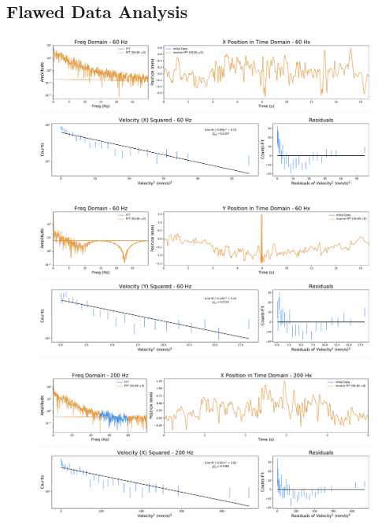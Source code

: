 \documentclass[12pt]{article}
\begin{document}
\subsection{Flawed Data Analysis}
\begin{figure}[ht]
\centering
    \includegraphics[width=\textwidth]{data_33_x_pos.pdf}
	\caption{}
    \label{fig:33_x_pos}
    \includegraphics[width=\textwidth]{data_33_x_vel.pdf}
	\caption{}
    \label{fig:33_x_vel}
\end{figure}

\begin{figure}[ht]
\centering
    \includegraphics[width=\textwidth]{data_33_y_pos.pdf}
	\caption{}
    \label{fig:33_y_pos}
    \includegraphics[width=\textwidth]{data_33_y_vel.pdf}
	\caption{}
    \label{fig:33_y_vel}
\end{figure}

\begin{figure}[ht]
\centering
    \includegraphics[width=\textwidth]{data_36_x_pos.pdf}
	\caption{}
    \label{fig:36_x_pos}
    \includegraphics[width=\textwidth]{data_36_x_vel.pdf}
	\caption{}
    \label{fig:36_x_vel}
\end{figure}
\end{document}
